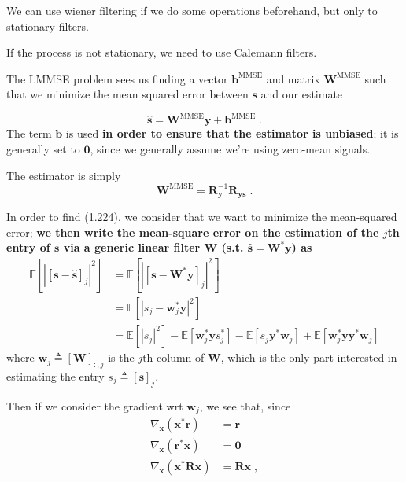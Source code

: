 \documentclass[a4paper, 12pt]{book}
\begin{document}
\begin{tcolorbox}[sharp corners, boxrule=0pt, leftrule=2pt, colframe=green!60!black, colback=green!5, left=5pt, top=3pt, bottom=3pt]
    We can use wiener filtering if we do some operations beforehand, but only to stationary filters.
    
    If the process is not stationary, we need to use Calemann filters.
\end{tcolorbox}

The LMMSE problem sees us finding a vector $\bm{b}^{\text{MMSE}}$ and matrix $\bm{W}^{\text{MMSE}}$ such that we minimize the mean squared error between $\bm{s}$ and our estimate

\begin{equation}
\hat{\bm{s}} = \bm{W}^{\text{MMSE}}\bm{y} + \bm{b}^{\text{MMSE}} \;. \tag{1.223}
\end{equation}
The term $\bm{b}$ is used \textbf{in order to ensure that the estimator is unbiased}; it is generally set to $\bm{0}$, since we generally assume we're using zero-mean signals.

The estimator is simply
\begin{equation}
\bm{W}^{\text{MMSE}} = \bm{R}_{\bm{y}}^{-1}\bm{R}_{\bm{ys}} \;. \tag{1.224}
\end{equation}

In order to find (1.224), we consider that we want to minimize the mean-squared error; \textbf{we then write the mean-square error on the estimation of the $j$th entry of $\bm{s}$ via a generic linear filter $\bm{W}$ (s.t. $\hat{\bm{s}} = \bm{W}^*\bm{y}$) as}
\begin{align}
\mathbb{E}[|[\bm{s} - \hat{\bm{s}}]_j|^2] &= \mathbb{E}[|[\bm{s} - \bm{W}^*\bm{y}]_j|^2] \tag{1.225} \\
&= \mathbb{E}[|s_j - \bm{w}_j^*\bm{y}|^2] \tag{1.226} \\
&= \mathbb{E}[|s_j|^2] - \mathbb{E}[\bm{w}_j^*\bm{y}s_j^*] - \mathbb{E}[s_j\bm{y}^*\bm{w}_j] + \mathbb{E}[\bm{w}_j^*\bm{y}\bm{y}^*\bm{w}_j] \tag{1.227}
\end{align}
where $\bm{w}_j \triangleq [\bm{W}]_{:,j}$ is the $j$th column of $\bm{W}$, which is the only part interested in estimating the entry $s_j \triangleq [\bm{s}]_j$.

Then if we consider the gradient wrt $\bm{w}_j$, we see that, since
\begin{align}
\nabla_{\bm{x}}(\bm{x}^* \bm{r}) &= \bm{r} \tag{D.5} \\
\nabla_{\bm{x}}(\bm{r}^* \bm{x}) &= \bm{0} \tag{D.6} \\
\nabla_{\bm{x}}(\bm{x}^* \bm{R} \bm{x}) &= \bm{R}\bm{x} \;, \tag{D.7}
\end{align}
\end{document}
